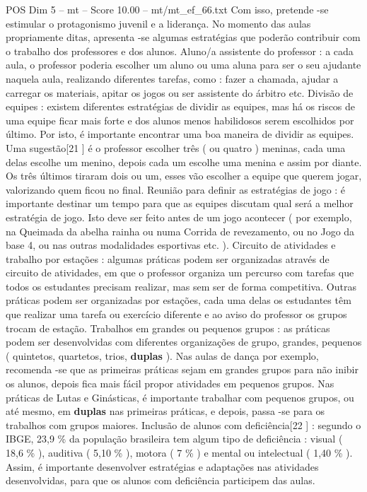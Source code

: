 \begin{textsample}{POS Dim 5 – mt – Score 10.00 – mt/mt\_ef\_66.txt}
Com isso, pretende -se estimular o protagonismo juvenil e a liderança.
No momento das aulas propriamente ditas, apresenta -se algumas estratégias que poderão contribuir com o trabalho dos professores e dos alunos.
Aluno/a assistente do professor : a cada aula, o professor poderia escolher um aluno ou uma aluna para ser o seu ajudante naquela aula, realizando diferentes tarefas, como : fazer a chamada, ajudar a carregar os materiais, apitar os jogos ou ser assistente do árbitro etc.
Divisão de equipes : existem diferentes estratégias de dividir as equipes, mas há os riscos de uma equipe ficar mais forte e dos alunos menos habilidosos serem escolhidos por último.
Por isto, é importante encontrar uma boa maneira de dividir as equipes.
Uma sugestão[21 ] é o professor escolher três ( ou quatro ) meninas, cada uma delas escolhe um menino, depois cada um escolhe uma menina e assim por diante.
Os três últimos tiraram dois ou um, esses vão escolher a equipe que querem jogar, valorizando quem ficou no final.
Reunião para definir as estratégias de jogo : é importante destinar um tempo para que as equipes discutam qual será a melhor estratégia de jogo.
Isto deve ser feito antes de um jogo acontecer ( por exemplo, na Queimada da abelha rainha ou numa Corrida de revezamento, ou no Jogo da base 4, ou nas outras modalidades esportivas etc. ).
Circuito de atividades e trabalho por estações : algumas práticas podem ser organizadas através de circuito de atividades, em que o professor organiza um percurso com tarefas que todos os estudantes precisam realizar, mas sem ser de forma competitiva.
Outras práticas podem ser organizadas por estações, cada uma delas os estudantes têm que realizar uma tarefa ou exercício diferente e ao aviso do professor os grupos trocam de estação.
Trabalhos em grandes ou pequenos grupos : as práticas podem ser desenvolvidas com diferentes organizações de grupo, grandes, pequenos ( quintetos, quartetos, trios, \textbf{duplas} ).
Nas aulas de dança por exemplo, recomenda -se que as primeiras práticas sejam em grandes grupos para não inibir os alunos, depois fica mais fácil propor atividades em pequenos grupos.
Nas práticas de Lutas e Ginásticas, é importante trabalhar com pequenos grupos, ou até mesmo, em \textbf{duplas} nas primeiras práticas, e depois, passa -se para os trabalhos com grupos maiores.
Inclusão de alunos com deficiência[22 ] : segundo o IBGE, 23,9 \% da população brasileira tem algum tipo de deficiência : visual ( 18,6 \% ), auditiva ( 5,10 \% ), motora ( 7 \% ) e mental ou intelectual ( 1,40 \% ).
Assim, é importante desenvolver estratégias e adaptações nas atividades desenvolvidas, para que os alunos com deficiência participem das aulas.

\end{textsample}
